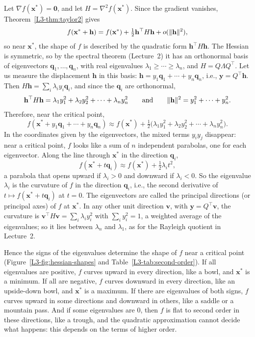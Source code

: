Let $\nabla f(\mathbf{x}^*) = \mathbf{0}$, and let $H = \nabla^2 f(\mathbf{x}^*)$. Since the gradient vanishes, Theorem~\ref{L3-thm:taylor2} gives
\[f(\mathbf{x}^* + \mathbf{h}) = f(\mathbf{x}^*) + \tfrac{1}{2}\mathbf{h}^\top H\mathbf{h} + o(\lVert \mathbf{h} \rVert^2),\]
so near $\mathbf{x}^*$, the shape of $f$ is described by the quadratic form $\mathbf{h}^\top H\mathbf{h}$. The Hessian is symmetric, so by the spectral theorem (Lecture~2) it has an orthonormal basis of eigenvectors $\mathbf{q}_1, \ldots, \mathbf{q}_n$, with real eigenvalues $\lambda_1 \geq \cdots \geq \lambda_n$, and $H = Q\Lambda Q^\top$. Let us measure the displacement $\mathbf{h}$ in this basis: $\mathbf{h} = y_1\mathbf{q}_1 + \cdots + y_n\mathbf{q}_n$, i.e., $\mathbf{y} = Q^\top\mathbf{h}$. Then $H\mathbf{h} = \sum_i \lambda_i y_i\mathbf{q}_i$, and since the $\mathbf{q}_i$ are orthonormal,
\[\mathbf{h}^\top H\mathbf{h} = \lambda_1 y_1^2 + \lambda_2 y_2^2 + \cdots + \lambda_n y_n^2 \qquad \text{and} \qquad \lVert \mathbf{h} \rVert^2 = y_1^2 + \cdots + y_n^2.\]
Therefore, near the critical point,
\[f(\mathbf{x}^* + y_1\mathbf{q}_1 + \cdots + y_n\mathbf{q}_n) \approx f(\mathbf{x}^*) + \tfrac{1}{2}\big(\lambda_1 y_1^2 + \lambda_2 y_2^2 + \cdots + \lambda_n y_n^2\big).\]
In the coordinates given by the eigenvectors, the mixed terms $y_i y_j$ disappear: near a critical point, $f$ looks like a sum of $n$ independent parabolas, one for each eigenvector. Along the line through $\mathbf{x}^*$ in the direction $\mathbf{q}_i$,
\[f(\mathbf{x}^* + t\mathbf{q}_i) \approx f(\mathbf{x}^*) + \tfrac{1}{2}\lambda_i t^2,\]
a parabola that opens upward if $\lambda_i > 0$ and downward if $\lambda_i < 0$. So the eigenvalue $\lambda_i$ is the curvature of $f$ in the direction $\mathbf{q}_i$, i.e., the second derivative of $t \mapsto f(\mathbf{x}^* + t\mathbf{q}_i)$ at $t = 0$. The eigenvectors are called the principal directions (or principal axes) of $f$ at $\mathbf{x}^*$. In any other unit direction $\mathbf{v}$, with $\mathbf{y} = Q^\top\mathbf{v}$, the curvature is $\mathbf{v}^\top H\mathbf{v} = \sum_i \lambda_i y_i^2$ with $\sum_i y_i^2 = 1$, a weighted average of the eigenvalues; so it lies between $\lambda_n$ and $\lambda_1$, as for the Rayleigh quotient in Lecture~2.

Hence the signs of the eigenvalues determine the shape of $f$ near a critical point (Figure~\ref{L3-fig:hessian-shapes} and Table~\ref{L3-tab:second-order}). If all eigenvalues are positive, $f$ curves upward in every direction, like a bowl, and $\mathbf{x}^*$ is a minimum. If all are negative, $f$ curves downward in every direction, like an upside-down bowl, and $\mathbf{x}^*$ is a maximum. If there are eigenvalues of both signs, $f$ curves upward in some directions and downward in others, like a saddle or a mountain pass. And if some eigenvalues are $0$, then $f$ is flat to second order in these directions, like a trough, and the quadratic approximation cannot decide what happens: this depends on the terms of higher order.


